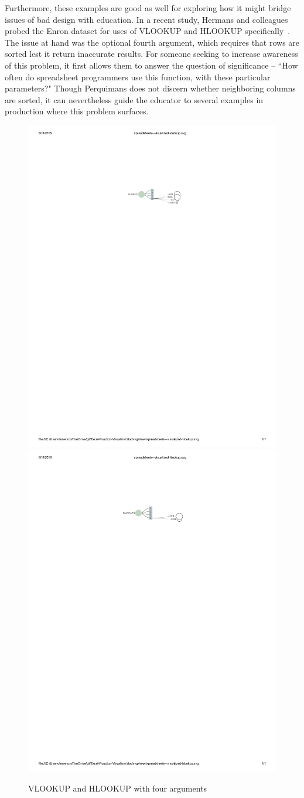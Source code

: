 \documentclass[conference]{IEEEtran}
\newcommand{\toolname}{Perquimans } \newcommand{\toolnameend}{Perquimans}
\begin{document}
	Furthermore, these examples are good as well for exploring how it might bridge
	issues of bad design with education. In a recent study, Hermans and colleagues
	probed the Enron dataset for uses of VLOOKUP and HLOOKUP
	specifically~\cite{hermans2015detecting}. The issue at hand was the optional
	fourth argument, which requires that rows are sorted lest it return inaccurate
	results. For someone seeking to increase awareness of this problem, it first
	allows them to answer the question of significance -- ``How often do
	spreadsheet programmers use this function, with these particular parameters?"
	Though \toolname does not discern whether neighboring columns are sorted, it
	can nevertheless guide the educator to several examples in production where
	this problem surfaces. \par
	
	\begin{figure}[h] \centering \includegraphics[width=.5\textwidth]{vlookup}
		\includegraphics[width=.5\textwidth]{hlookup} \caption{VLOOKUP and HLOOKUP with
			four arguments} \label{fig:vhlookups}\end{figure}
	
\end{document}
